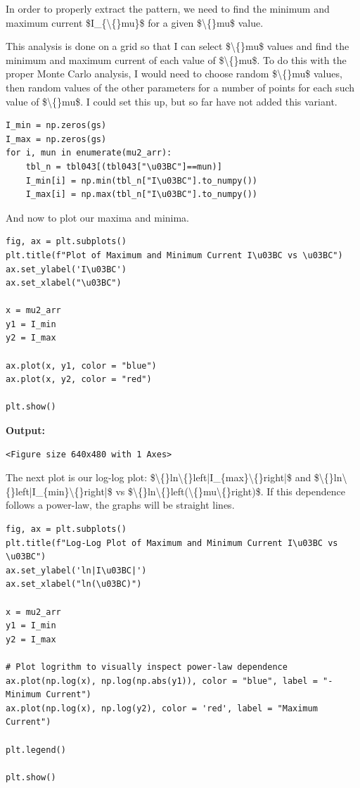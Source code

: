 \documentclass{article}
\begin{document}
In order to properly extract the pattern, we need to find the minimum and maximum current \$I\_\{\textbackslash\{\}mu\}\$ for a given \$\textbackslash\{\}mu\$ value. 

This analysis is done on a grid so that I can select \$\textbackslash\{\}mu\$ values and find the minimum and maximum current of each value of \$\textbackslash\{\}mu\$. To do this with the proper Monte Carlo analysis, I would need to choose random \$\textbackslash\{\}mu\$ values, then random values of the other parameters for a number of points for each such value of \$\textbackslash\{\}mu\$. I could set this up, but so far have not added this variant.

\begin{lstlisting}
I_min = np.zeros(gs)
I_max = np.zeros(gs)
for i, mun in enumerate(mu2_arr):
    tbl_n = tbl043[(tbl043["\u03BC"]==mun)]
    I_min[i] = np.min(tbl_n["I\u03BC"].to_numpy())
    I_max[i] = np.max(tbl_n["I\u03BC"].to_numpy())\end{lstlisting}

And now to plot our maxima and minima.

\begin{lstlisting}
fig, ax = plt.subplots()
plt.title(f"Plot of Maximum and Minimum Current I\u03BC vs \u03BC")
ax.set_ylabel('I\u03BC')
ax.set_xlabel("\u03BC")

x = mu2_arr
y1 = I_min
y2 = I_max

ax.plot(x, y1, color = "blue")
ax.plot(x, y2, color = "red")

plt.show()\end{lstlisting}

\textbf{Output:}\begin{verbatim}
<Figure size 640x480 with 1 Axes>
\end{verbatim}

The next plot is our log-log plot: \$\textbackslash\{\}ln\textbackslash\{\}left|I\_\{max\}\textbackslash\{\}right|\$ and \$\textbackslash\{\}ln\textbackslash\{\}left|I\_\{min\}\textbackslash\{\}right|\$ vs \$\textbackslash\{\}ln\textbackslash\{\}left(\textbackslash\{\}mu\textbackslash\{\}right)\$. If this dependence follows a power-law, the graphs will be straight lines.

\begin{lstlisting}
fig, ax = plt.subplots()
plt.title(f"Log-Log Plot of Maximum and Minimum Current I\u03BC vs \u03BC")
ax.set_ylabel('ln|I\u03BC|')
ax.set_xlabel("ln(\u03BC)")

x = mu2_arr
y1 = I_min
y2 = I_max

# Plot logrithm to visually inspect power-law dependence
ax.plot(np.log(x), np.log(np.abs(y1)), color = "blue", label = "- Minimum Current")
ax.plot(np.log(x), np.log(y2), color = 'red', label = "Maximum Current")

plt.legend()

plt.show()\end{lstlisting}
\end{document}
